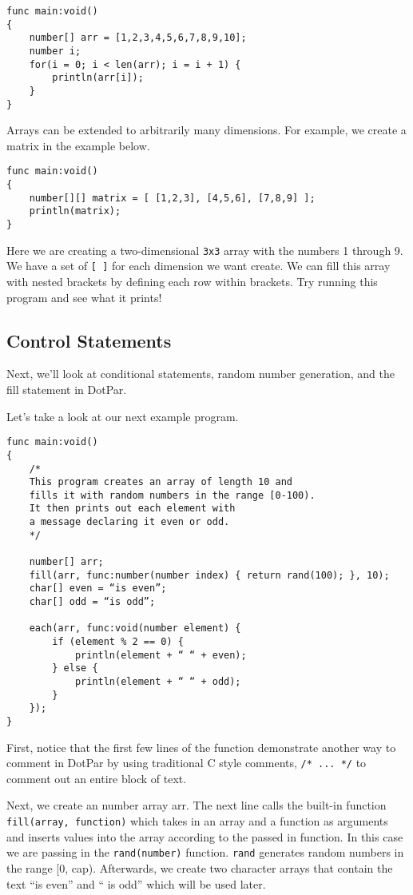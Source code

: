 \begin{verbatim}
func main:void()
{
    number[] arr = [1,2,3,4,5,6,7,8,9,10];
    number i;
    for(i = 0; i < len(arr); i = i + 1) {
        println(arr[i]);
    }
}
\end{verbatim}

Arrays can be extended to arbitrarily many dimensions. For example, we create a matrix in the example below.

\begin{verbatim}
func main:void()
{
    number[][] matrix = [ [1,2,3], [4,5,6], [7,8,9] ];
    println(matrix);
}
\end{verbatim}

Here we are creating a two-dimensional \verb=3x3= array with the numbers 1 through 9.  We have a  set of \verb=[ ]= for each dimension we want create.  We can fill this array with nested brackets by defining each row within brackets. Try running this program and see what it prints!

\subsection{Control Statements}

Next, we'll look at conditional statements, random number generation, and the fill statement in DotPar. 

Let's take a look at our next example program.

\begin{verbatim}
func main:void()
{
    /*
    This program creates an array of length 10 and 
    fills it with random numbers in the range [0-100).
    It then prints out each element with 
    a message declaring it even or odd.  
    */

    number[] arr;
    fill(arr, func:number(number index) { return rand(100); }, 10);
    char[] even = “is even”;
    char[] odd = “is odd”;

    each(arr, func:void(number element) {
        if (element % 2 == 0) {
            println(element + “ “ + even);
        } else {
            println(element + “ “ + odd);
        }
    });
}
\end{verbatim}

First, notice that the first few lines of the function demonstrate another way to comment in DotPar by using traditional C style comments, \verb=/* ... */= to comment out an entire block of text.

Next, we create an number array arr. The next line calls the built-in function \verb=fill(array, function)= which takes in an array and a function as arguments and inserts values into the array according to the passed in function. In this case we are passing in the \verb=rand(number)= function. \verb=rand= generates random numbers in the range [0, cap). Afterwards, we create two character arrays that contain the text ``is even'' and `` is odd'' which will be used later.

